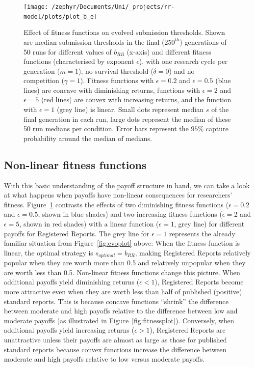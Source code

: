 \documentclass[british,,man,floatsintext]{apa6}
\begin{document}
\begin{figure}

{\centering \texttt{[image: /zephyr/Documents/Uni/\_projects/rr-model/plots/plot\_b\_e]} 

}

\caption{Effect of fitness functions on evolved submission thresholds. Shown are median submission thresholds in the final (\(250^{th}\)) generations of 50 runs for different values of \(b_{RR}\) (x-axis) and different fitness functions (characterised by exponent \(\epsilon\)), with one research cycle per generation (\(m = 1\)), no survival threshold (\(\delta = 0\)) and no competition (\(\gamma = 1\)). Fitness functions with \(\epsilon = 0.2\) and \(\epsilon = 0.5\) (blue lines) are concave with diminishing returns, functions with \(\epsilon = 2\) and \(\epsilon = 5\) (red lines) are convex with increasing returns, and the function with \(\epsilon = 1\) (grey line) is linear. Small dots represent median \(s\) of the final generation in each run, large dots represent the median of these 50 run medians per condition. Error bars represent the \(95\%\) capture probability around the median of medians.}\label{fig:epsilonplot}
\end{figure}

\hypertarget{non-linear-fitness-functions-1}{%
\subsection{Non-linear fitness functions}\label{non-linear-fitness-functions-1}}

With this basic understanding of the payoff structure in hand, we can take a look at what happens when payoffs have non-linear consequences for researchers' fitness.
Figure~\ref{fig:epsilonplot} contrasts the effects of two diminishing fitness functions (\(\epsilon = 0.2\) and \(\epsilon = 0.5\), shown in blue shades) and two increasing fitness functions (\(\epsilon = 2\) and \(\epsilon = 5\), shown in red shades) with a linear function (\(\epsilon = 1\), grey line) for different payoffs for Registered Reports.
The grey line for \(\epsilon = 1\) represents the already familiar situation from Figure~\ref{fig:evoplot} above:
When the fitness function is linear, the optimal strategy is \(s_{optimal} = b_{RR}\), making Registered Reports relatively popular when they are worth more than 0.5 and relatively unpopular when they are worth less than 0.5.
Non-linear fitness functions change this picture.
When additional payoffs yield diminishing returns (\(\epsilon <1\)), Registered Reports become more attractive even when they are worth less than half of published (positive) standard reports.
This is because concave functions \enquote{shrink} the difference between moderate and high payoffs relative to the difference between low and moderate payoffs (as illustrated in Figure~\ref{fig:fitnessplot}).
Conversely, when additional payoffs yield increasing returns (\(\epsilon > 1\)), Registered Reports are unattractive unless their payoffs are almost as large as those for published standard reports because convex functions increase the difference between moderate and high payoffs relative to low versus moderate payoffs.
\end{document}
